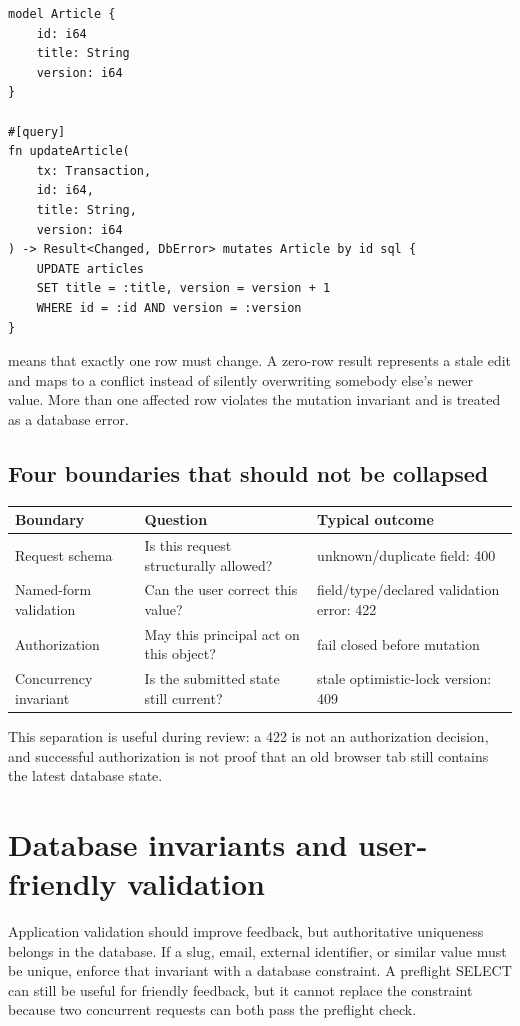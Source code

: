 \begin{lstlisting}[language=Velran]
model Article {
    id: i64
    title: String
    version: i64
}

#[query]
fn updateArticle(
    tx: Transaction,
    id: i64,
    title: String,
    version: i64
) -> Result<Changed, DbError> mutates Article by id sql {
    UPDATE articles
    SET title = :title, version = version + 1
    WHERE id = :id AND version = :version
}
\end{lstlisting}

 means that exactly one row must change. A zero-row result represents a stale edit and maps to a conflict instead of silently overwriting somebody else's newer value. More than one affected row violates the mutation invariant and is treated as a database error.

\subsection*{Four boundaries that should not be collapsed}

\begin{longtable}{L{0.20\textwidth}L{0.31\textwidth}L{0.39\textwidth}}
\toprule
Boundary & Question & Typical outcome \\
\midrule
Request schema & Is this request structurally allowed? & unknown/duplicate field: 400 \\
Named-form validation & Can the user correct this value? & field/type/declared validation error: 422 \\
Authorization & May this principal act on this object? & fail closed before mutation \\
Concurrency invariant & Is the submitted state still current? & stale optimistic-lock version: 409 \\
\bottomrule
\end{longtable}

This separation is useful during review: a 422 is not an authorization decision, and successful authorization is not proof that an old browser tab still contains the latest database state.

\section{Database invariants and user-friendly validation}

Application validation should improve feedback, but authoritative uniqueness belongs in the database. If a slug, email, external identifier, or similar value must be unique, enforce that invariant with a database  constraint. A preflight SELECT can still be useful for friendly feedback, but it cannot replace the constraint because two concurrent requests can both pass the preflight check.

